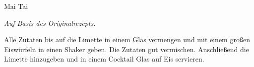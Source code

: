 \documentclass[../recipe-collections/cocktails.tex]{subfiles}
\begin{document}
\begin{recipe}{Mai Tai}{}{}

  \freeform{}\textit{Auf Basis des Originalrezepts.}


  Alle Zutaten bis auf die Limette in einem Glas vermengen und mit einem großen Eiswürfeln in einen Shaker geben.
  Die Zutaten gut vermischen.
  Anschließend die Limette hinzugeben und in einem Cocktail Glas auf Eis servieren.

  \freeform{}\hrulefill{}

\end{recipe}
\end{document}
